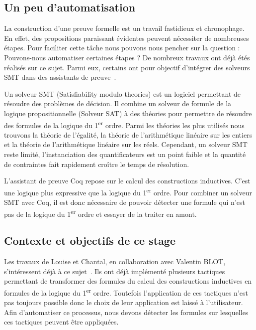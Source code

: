\documentclass[titlepage]{article}
\begin{document}
\subsection{Un peu d'automatisation}
La construction d'une preuve formelle est un travail fastidieux et chronophage. En effet, des propositions paraissant évidentes peuvent nécessiter de nombreuses étapes.
Pour faciliter cette tâche nous pouvons nous pencher sur la question : Pouvons-nous automatiser certaines étapes ? De nombreux travaux ont déjà étés réalisés sur ce sujet. Parmi eux, certains ont pour objectif d'intégrer des solveurs SMT dans des assistants de preuve~\cite{DBLP:conf/cpp/ArmandFGKTW11}.

Un solveur SMT (Satisfiability modulo theories) est un logiciel permettant de résoudre des problèmes de décision. Il combine un solveur de formule de la logique propositionnelle (Solveur SAT) à des théories pour permettre de résoudre des formules de la logique du 1\textsuperscript{er} ordre. Parmi les théories les plus utilisés nous trouvons la théorie de l'égalité, la théorie de l'arithmétique linéaire sur les entiers et la théorie de l'arithmétique linéaire sur les réels. Cependant, un solveur SMT reste limité, l'instanciation des quantificateurs est un point faible et la quantité de contraintes fait rapidement croître le temps de résolution.

L'assistant de preuve Coq repose sur le calcul des constructions inductives. C'est une logique plus expressive que la logique du 1\textsuperscript{er} ordre. Pour combiner un solveur SMT avec Coq, il est donc nécessaire de pouvoir détecter une formule qui n'est pas de la logique du 1\textsuperscript{er} ordre et essayer de la traiter en amont.


\subsection{Contexte et objectifs de ce stage}
Les travaux de Louise et Chantal, en collaboration avec Valentin BLOT, s'intéressent déjà à ce sujet~\cite{DBLP:journals/corr/abs-2107-02353,DBLP:journals/corr/abs-2204-02643,DBLP:conf/cpp/Blot0CPKMV23}. Ils ont déjà implémenté plusieurs tactiques permettant de transformer des formules du calcul des constructions inductives en formules de la logique du 1\textsuperscript{er} ordre. Toutefois l'application de ces tactiques n'est pas toujours possible donc le choix de leur application est laissé à l'utilisateur. Afin d'automatiser ce processus, nous devons détecter les formules sur lesquelles ces tactiques peuvent être appliquées.
\end{document}

